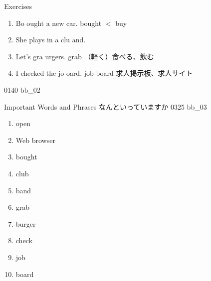 \documentclass[aspectratio=169,xcolor={dvipsnames,table}]{beamer}
\begin{document}
\begin{frame}[plain]{Exercises }
  \Large
  \begin{enumerate}
    \item<2-> Bo  ought   a new car.%
          \hfill{\small bought  $<$ buy }
    \item<4-> She plays \only<5->{\textcolor{black}{\textbottomtiebar\ }} in  a clu  \alt<1-4>{b}{\textbf{b}}and.
    \item<6-> Let's gra  urgers. %
          \hfill{}{\small grab （軽く）食べる、飲む}
    \item<8-> I checked the jo  oard. %
          \hfill{}{\small job board 求人掲示板、求人サイト}
  \end{enumerate}

  \hfill{\tiny 0140}\,{\scriptsize {}\,bb\_02}

\end{frame}
\begin{frame}[plain]{Important Words and Phrases}
  なんといっていますか%
  \hfill{\tiny 0325}\,{\scriptsize {}\,bb\_03}\pause
  \vspace{-5pt}
  \Large
  \begin{enumerate}[<+- |alert@+>]\setlength{\itemsep}{-1.8pt}
    \item open
    \item Web browser%
    \item bought
    \item club
    \item band
    \item grab
    \item burger
    \item check
    \item job
    \item board
  \end{enumerate}

\end{frame}
\end{document}
